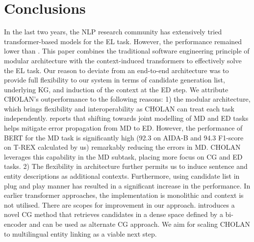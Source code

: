 \documentclass[11pt,a4paper]{article}
\begin{document}
\section{Conclusions} \label{sec:conclusion}
In the last two years, the NLP research community has extensively tried transformer-based models for the EL task. However, the performance remained lower than \citet{kolitsas2018end}. This paper combines the traditional software engineering principle of modular architecture with the context-induced transformers to effectively solve the EL task. Our reason to deviate from an end-to-end architecture was to provide full flexibility to our system in terms of candidate generation list, underlying KG, and induction of the context at the ED step. We attribute CHOLAN's outperformance to the following reasons: 1) the modular architecture, which brings flexibility and interoperability as CHOLAN can treat each task independently. \citet{kolitsas2018end} reports that shifting towards joint modelling of MD and ED tasks helps mitigate error propagation from MD to ED. However, the performance of BERT for the MD task is significantly high (92.3 on AIDA-B and 94.3 F1-score on T-REX calculated by us) remarkably reducing the errors in MD. CHOLAN leverages this capability in the MD subtask, placing more focus on CG and ED tasks. 2) The flexibility in architecture further permits us to induce sentence and entity descriptions as additional contexts. Furthermore, using candidate list in plug and play manner has resulted in a significant increase in the performance. In earlier transformer approaches, the implementation is monolithic and context is not utilised. 
There are scopes for improvement in our approach.
\citet{wu2019zero} introduces a novel CG method that retrieves candidates in a dense space defined by a bi-encoder and can be used as alternate CG approach. We aim for scaling CHOLAN to multilingual entity linking as a viable next step.



 
\end{document}
